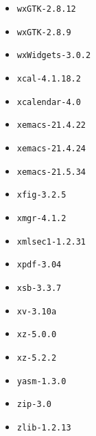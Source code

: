 \begin{multicols}{3}
\begin{itemize}
\item \verb|wxGTK-2.8.12|
\item \verb|wxGTK-2.8.9|
\item \verb|wxWidgets-3.0.2|
\item \verb|xcal-4.1.18.2|
\item \verb|xcalendar-4.0|
\item \verb|xemacs-21.4.22|
\item \verb|xemacs-21.4.24|
\item \verb|xemacs-21.5.34|
\item \verb|xfig-3.2.5|
\item \verb|xmgr-4.1.2|
\item \verb|xmlsec1-1.2.31|
\item \verb|xpdf-3.04|
\item \verb|xsb-3.3.7|
\item \verb|xv-3.10a|
\item \verb|xz-5.0.0|
\item \verb|xz-5.2.2|
\item \verb|yasm-1.3.0|
\item \verb|zip-3.0|
\item \verb|zlib-1.2.13|
\end{itemize}
\end{multicols}
\normalsize

